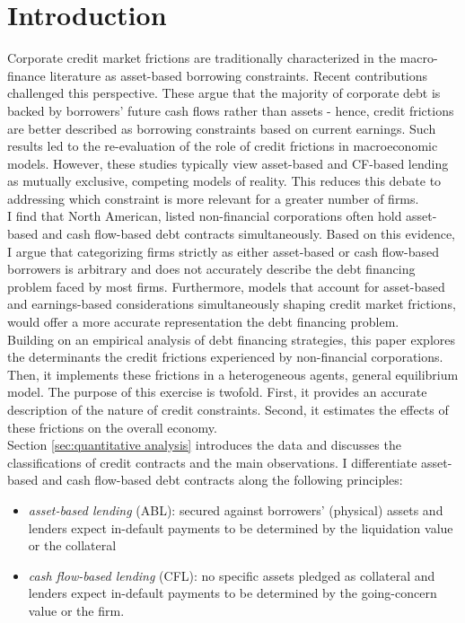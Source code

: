 \documentclass[12pt]{article}
\begin{document}
\pagebreak{}


\section{Introduction \label{sec:introduction}} 

Corporate credit market frictions are traditionally characterized in the macro-finance literature as asset-based borrowing constraints. Recent contributions challenged this perspective. These argue that the majority of corporate debt is backed by borrowers’ future cash flows rather than assets - hence, credit frictions are better described as borrowing constraints based on current earnings. Such results led to the re-evaluation of the role of credit frictions in macroeconomic models. However, these studies typically view asset-based and CF-based lending as mutually exclusive, competing models of reality. This reduces this debate to addressing which constraint is more relevant for a greater number of firms. \vspace{3mm} \\
I find that North American, listed non-financial corporations often hold asset-based and cash flow-based debt contracts simultaneously. Based on this evidence, I argue that categorizing firms strictly as either asset-based or cash flow-based borrowers is arbitrary and does not accurately describe the debt financing problem faced by most firms. Furthermore, models that account for asset-based and earnings-based considerations simultaneously shaping credit market frictions, would offer a more accurate representation the debt financing problem. \vspace{3mm} \\
Building on an empirical analysis of debt financing strategies, this paper explores the determinants the credit frictions experienced by non-financial corporations. Then, it implements these frictions in a heterogeneous agents, general equilibrium model. The purpose of this exercise is twofold. First, it provides an accurate description of the nature of credit constraints. Second, it estimates the effects of these frictions on the overall economy. 
\vspace{3mm} \\
Section \ref{sec:quantitative analysis} introduces the data and discusses the classifications of credit contracts and the main observations. I differentiate asset-based and cash flow-based debt contracts along the following principles:  
\begin{itemize}
\item \textit{asset-based lending} (ABL): secured against borrowers' (physical) assets and lenders expect in-default payments to be determined by the liquidation value or the collateral
\item \textit{cash flow-based lending} (CFL): no specific assets pledged as collateral and lenders expect in-default payments to be determined by the going-concern value or the firm.
\end{itemize}
\end{document}
